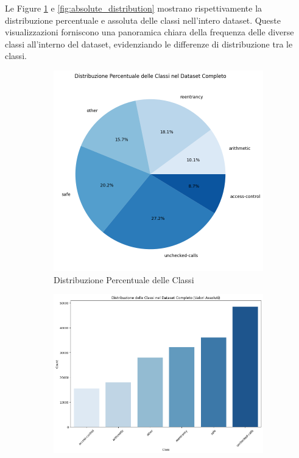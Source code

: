 \documentclass[../../Thesis.tex]{subfiles}
\begin{document}
Le Figure \ref{fig:relative_distribution} e \ref{fig:absolute_distribution} mostrano rispettivamente la distribuzione percentuale e assoluta delle classi nell'intero dataset. Queste visualizzazioni forniscono una panoramica chiara della frequenza delle diverse classi all'interno del dataset, evidenziando le differenze di distribuzione tra le classi.
\begin{figure}[h!]
    \centering
    \begin{subfigure}[b]{0.45\linewidth}
      \includegraphics[width=\linewidth]{../../img/class-distribution-relative.png}
      \caption{Distribuzione Percentuale delle Classi}
      \label{fig:relative_distribution}
    \end{subfigure}
    \hspace{0.5cm}
    \begin{subfigure}[b]{0.45\linewidth}
      \includegraphics[width=\linewidth]{../../img/class-distribution-absolute.png}

\end{subfigure}
\end{figure}
\end{document}
